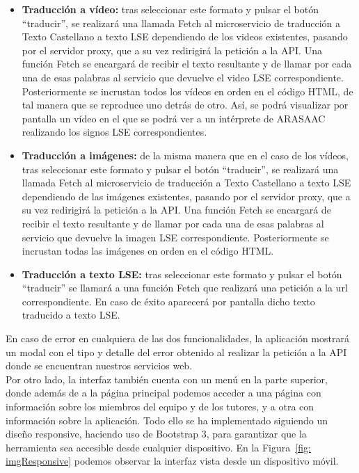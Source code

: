\begin{itemize}

	\item \textbf{Traducción a vídeo:} tras seleccionar este formato y pulsar el botón ``traducir'', se realizará una llamada Fetch al microservicio de traducción a Texto Castellano a texto LSE dependiendo de los videos existentes, pasando por el servidor proxy, que a su vez redirigirá la petición a la API. Una función Fetch se encargará de recibir el texto resultante y de llamar por cada una de esas palabras al servicio que devuelve el video LSE correspondiente. Posteriormente se incrustan todos los vídeos en orden en el código HTML, de tal manera que se reproduce uno detrás de otro. Así, se podrá visualizar por pantalla un vídeo en el que se podrá ver a un intérprete de ARASAAC realizando los signos LSE correspondientes.
	
	\item \textbf{Traducción a imágenes:} de la misma manera que en el caso de los vídeos, tras seleccionar este formato y pulsar el botón ``traducir'', se realizará una llamada Fetch  al microservicio de traducción a Texto Castellano a texto LSE dependiendo de las imágenes existentes, pasando por el servidor proxy, que a su vez redirigirá la petición a la API. Una función Fetch se encargará de recibir el texto resultante y de llamar por cada una de esas palabras al servicio que devuelve la imagen LSE correspondiente. Posteriormente se incrustan todas las imágenes en orden en el código HTML. 

	\item \textbf{Traducción a texto LSE:} tras seleccionar este formato y pulsar el botón ``traducir'' se llamará a una función Fetch que realizará una petición a la url correspondiente. En caso de éxito aparecerá por pantalla dicho texto traducido a texto LSE.

\end{itemize}


En caso de error en cualquiera de las dos funcionalidades, la aplicación mostrará un modal con el tipo y detalle del error obtenido al realizar la petición a la API donde se encuentran nuestros servicios web.\\ 

Por otro lado, la interfaz también cuenta con un menú en la parte superior, donde además de a la página principal podemos acceder a una página con información sobre los miembros del equipo y de los tutores, y a otra con información sobre la aplicación. Todo ello se ha implementado siguiendo un diseño responsive, haciendo uso de Bootstrap 3, para garantizar que la herramienta sea accesible desde cualquier dispositivo. En la Figura~\ref {fig: imgResponsive} podemos observar la interfaz vista desde un dispositivo móvil.\\


